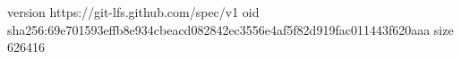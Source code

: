 version https://git-lfs.github.com/spec/v1
oid sha256:69e701593effb8e934cbeacd082842ec3556e4af5f82d919fac011443f620aaa
size 626416
